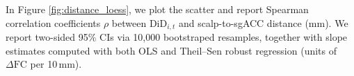In Figure \ref{fig:distance_loess}, we plot the scatter and report Spearman correlation coefficients $\rho$ between $\mathrm{DiD}_{i,t}$ and scalp-to-sgACC distance (mm). We report two-sided 95\% CIs via 10,000 bootstraped resamples, together with slope estimates computed with both OLS and Theil–Sen robust regression (units of $\Delta\mathrm{FC}$ per 10\,mm). 




